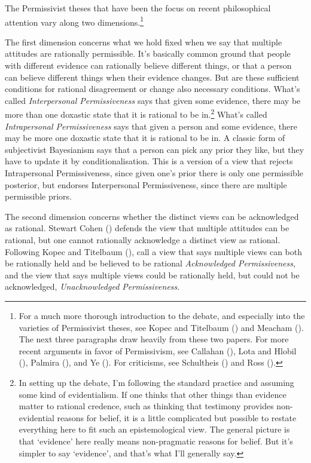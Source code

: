 \documentclass[
  11pt,
  letterpaper,
  DIV=11,
  numbers=noendperiod,
  twoside]{scrartcl}
\begin{document}
The Permissivist theses that have been the focus on recent philosophical
attention vary along two dimensions.\footnote{For a much more thorough
  introduction to the debate, and especially into the varieties of
  Permissivist theses, see Kopec and Titelbaum
  () and Meacham
  (). The next three paragraphs draw
  heavily from these two papers. For more recent arguments in favor of
  Permissivism, see Callahan (), Lota
  and Hlobil (), Palmira
  (), and Ye
  (). For criticisms, see Schultheis
  () and Ross
  ().}

The first dimension concerns what we hold fixed when we say that
multiple attitudes are rationally permissible. It's basically common
ground that people with different evidence can rationally believe
different things, or that a person can believe different things when
their evidence changes. But are these sufficient conditions for rational
disagreement or change also necessary conditions. What's called
\emph{Interpersonal Permissiveness} says that given some evidence, there
may be more than one doxastic state that it is rational to be
in.\footnote{In setting up the debate, I'm following the standard
  practice and assuming some kind of evidentialism. If one thinks that
  other things than evidence matter to rational credence, such as
  thinking that testimony provides non-evidential reasons for belief, it
  is a little complicated but possible to restate everything here to fit
  such an epistemological view. The general picture is that `evidence'
  here really means non-pragmatic reasons for belief. But it's simpler
  to say `evidence', and that's what I'll generally say.} What's called
\emph{Intrapersonal Permissiveness} says that given a person and some
evidence, there may be more one doxastic state that it is rational to be
in. A classic form of subjectivist Bayesianism says that a person can
pick any prior they like, but they have to update it by
conditionalisation. This is a version of a view that rejects
Intrapersonal Permissiveness, since given one's prior there is only one
permissible posterior, but endorses Interpersonal Permissiveness, since
there are multiple permissible priors.

The second dimension concerns whether the distinct views can be
acknowledged as rational. Stewart Cohen ()
defends the view that multiple attitudes can be rational, but one cannot
rationally acknowledge a distinct view as rational. Following Kopec and
Titelbaum (), call a view that
says multiple views can both be rationally held and be believed to be
rational \emph{Acknowledged Permissiveness}, and the view that says
multiple views could be rationally held, but could not be acknowledged,
\emph{Unacknowledged Permissiveness}.
\end{document}

